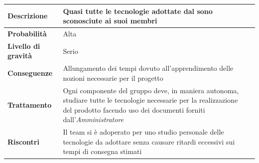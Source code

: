 \begin{center}
	
	\begin{tabular}{|>{\centering}m{4cm} ||>{\centering}m{8cm} |>{\centering\arraybackslash}m{0pt}@{}|}
		\hline
		\textbf{Descrizione} & Quasi tutte le tecnologie adottate dal \glossario{team} sono sconosciute ai suoi membri & \\[2ex]
		\hline	
		\textbf{Probabilità} & Alta &\\[1ex]
		\hline
		\textbf{Livello di gravità} & Serio & \\[1ex]
		\hline
		\textbf{Conseguenze} & Allungamento dei tempi dovuto all'apprendimento delle nozioni necessarie per il progetto & \\[1ex]
		\hline
		\textbf{Trattamento} & Ogni componente del gruppo deve, in maniera autonoma, studiare tutte le tecnologie necessarie per la realizzazione del prodotto facendo uso dei documenti forniti dall’\emph{Amministratore} & \\[1ex] 
		\hline
		\textbf{Riscontri} & Il team si è adoperato per uno studio personale delle tecnologie da adottare senza causare ritardi eccessivi sui tempi di consegna stimati & \\[1ex]
		\hline
	\end{tabular}
	
\end{center}


